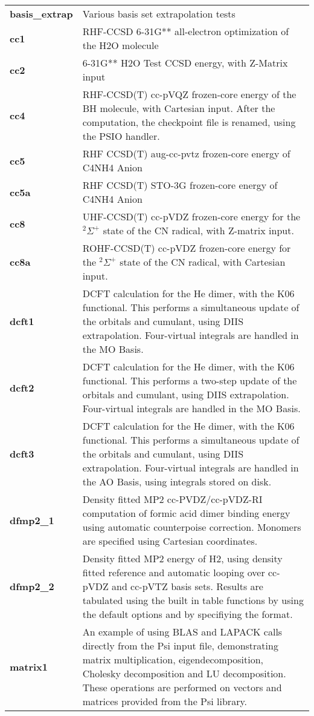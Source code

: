 \begin{tabular*}{\textwidth}[tb]{p{}p{}}
{\bf basis\_extrap} &  Various basis set extrapolation tests\\
{\bf cc1} &  RHF-CCSD 6-31G** all-electron optimization of the H2O molecule\\
{\bf cc2} &  6-31G** H2O Test CCSD energy, with Z-Matrix input\\
{\bf cc4} &  RHF-CCSD(T) cc-pVQZ frozen-core energy of the BH molecule, with Cartesian input. After the computation, the checkpoint file is renamed, using the PSIO handler.\\
{\bf cc5} &  RHF CCSD(T) aug-cc-pvtz frozen-core energy of C4NH4 Anion\\
{\bf cc5a} &  RHF CCSD(T) STO-3G frozen-core energy of C4NH4 Anion\\
{\bf cc8} &  UHF-CCSD(T) cc-pVDZ frozen-core energy for the $^2\Sigma^+$ state of the CN radical, with Z-matrix input.\\
{\bf cc8a} &  ROHF-CCSD(T) cc-pVDZ frozen-core energy for the $^2\Sigma^+$ state of the CN radical, with Cartesian input.\\
{\bf dcft1} &  DCFT calculation for the He dimer, with the K06 functional. This performs a simultaneous update of the orbitals and cumulant, using DIIS extrapolation. Four-virtual integrals are handled in the MO Basis.\\
{\bf dcft2} &  DCFT calculation for the He dimer, with the K06 functional. This performs a two-step update of the orbitals and cumulant, using DIIS extrapolation. Four-virtual integrals are handled in the MO Basis.\\
{\bf dcft3} &  DCFT calculation for the He dimer, with the K06 functional. This performs a simultaneous update of the orbitals and cumulant, using DIIS extrapolation. Four-virtual integrals are handled in the AO Basis, using integrals stored on disk.\\
{\bf dfmp2\_1} &  Density fitted MP2 cc-PVDZ/cc-pVDZ-RI computation of formic acid dimer binding energy using automatic counterpoise correction.  Monomers are specified using Cartesian coordinates.\\
{\bf dfmp2\_2} &  Density fitted MP2 energy of H2, using density fitted reference and automatic looping over cc-pVDZ and cc-pVTZ basis sets. Results are tabulated using the built in table functions by using the default options and by specifiying the format.\\
{\bf matrix1} &  An example of using BLAS and LAPACK calls directly from the Psi input file, demonstrating matrix multiplication, eigendecomposition, Cholesky decomposition and LU decomposition. These operations are performed on vectors and matrices provided from the Psi library.\\

\end{tabular*}
